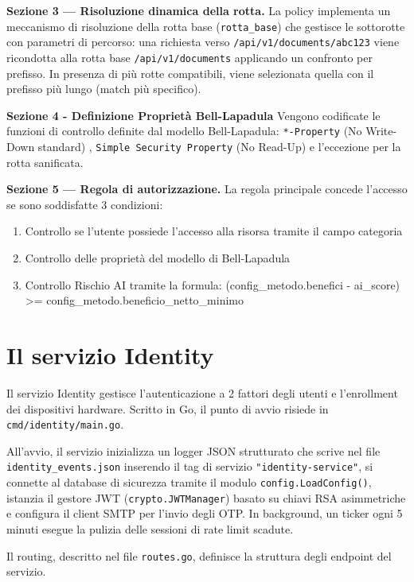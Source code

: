 \textbf{Sezione 3 — Risoluzione dinamica della rotta.} La policy implementa un meccanismo di risoluzione della rotta base (\texttt{rotta\_base}) che gestisce le sottorotte con parametri di percorso: una richiesta verso \texttt{/api/v1/documents/abc123} viene ricondotta alla rotta base \texttt{/api/v1/documents} applicando un confronto per prefisso. In presenza di più rotte compatibili, viene selezionata quella con il prefisso più lungo (match più specifico).

\textbf{Sezione 4 - Definizione Proprietà Bell-Lapadula}
Vengono codificate le funzioni di controllo definite dal modello Bell-Lapadula: \texttt{*-Property} (No Write-Down standard) , \texttt{Simple Security Property} (No Read-Up) e l'eccezione per la rotta sanificata.

\textbf{Sezione 5 — Regola di autorizzazione.} La regola principale concede l'accesso se sono soddisfatte 3 condizioni:
\begin{enumerate}
    \item Controllo se l'utente possiede l'accesso alla risorsa tramite il campo categoria
    \item Controllo delle proprietà del modello di Bell-Lapadula
    \item Controllo Rischio AI tramite la formula:
    (config\_metodo.benefici - ai\_score) >= config\_metodo.beneficio\_netto\_minimo
     
\end{enumerate}

\section{Il servizio Identity}

Il servizio Identity gestisce l'autenticazione a 2 fattori degli utenti e l'enrollment dei dispositivi hardware. Scritto in Go, il punto di avvio risiede in \texttt{cmd/identity/main.go}.

All'avvio, il servizio inizializza un logger JSON strutturato che scrive nel file \texttt{identity\_events.json} inserendo il tag di servizio \texttt{"identity-service"}, si connette al database di sicurezza tramite il modulo \texttt{config.LoadConfig()}, istanzia il gestore JWT (\texttt{crypto.JWTManager}) basato su chiavi RSA asimmetriche e configura il client SMTP per l'invio degli OTP. In background, un ticker ogni 5 minuti esegue la pulizia delle sessioni di rate limit scadute.

Il routing, descritto nel file \texttt{routes.go}, definisce la struttura degli endpoint del servizio.


